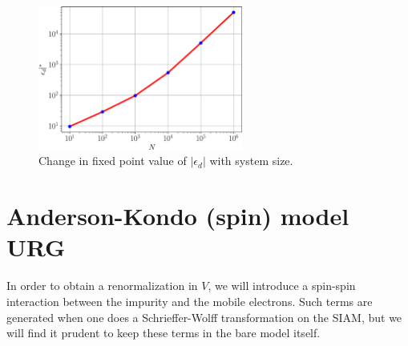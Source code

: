\documentclass[twoside]{report}
\numberwithin{equation}{section}
\begin{document}
\begin{figure}[htpb]
	\centering
	\includegraphics[width=0.6\textwidth]{../figures/ed_vs_size.pdf}
	\caption{Change in fixed point value of \(|\epsilon_d|\) with system size.}
	\label{edvsD}
\end{figure}
\section{Anderson-Kondo (spin) model URG}
In order to obtain a renormalization in \(V\), we will introduce a spin-spin interaction between the impurity and the mobile electrons. Such terms are generated when one does a Schrieffer-Wolff transformation on the SIAM, but we will find it prudent to keep these terms in the bare model itself.
\end{document}
